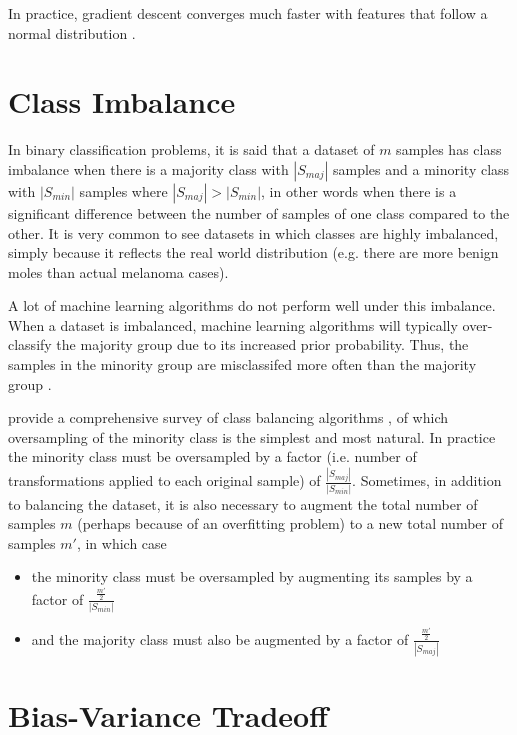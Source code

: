 In practice, gradient descent converges much faster with features that follow a normal distribution \cite{batchnormalization}.

\section{Class Imbalance}
\label{subsection:classimbalance}

In binary classification problems, it is said that a dataset of $m$ samples has class imbalance when there is a majority class with $|S_{maj}|$ samples and a minority class with $|S_{min}|$ samples where $|S_{maj}| > |S_{min}|$, in other words when there is a significant difference between the number of samples of one class compared to the other. It is very common to see datasets in which classes are highly imbalanced, simply because it reflects the real world distribution (e.g. there are more benign moles than actual melanoma cases).

A lot of machine learning algorithms do not perform well under this imbalance. When a dataset is imbalanced, machine learning algorithms will typically over-classify the majority group due to its increased prior probability. Thus, the samples in the minority group are misclassifed more often than the majority group \cite{Johnson2019}.

\citeauthor{haibo2009} provide a comprehensive survey of class balancing algorithms \cite{haibo2009}, of which oversampling of the minority class is the simplest and most natural. In practice the minority class must be oversampled by a factor (i.e. number of transformations applied to each original sample) of $\frac{|S_{maj}|}{|S_{min}|}$. Sometimes, in addition to balancing the dataset, it is also necessary to augment the total number of samples $m$ (perhaps because of an overfitting problem) to a new total number of samples $m'$, in which case

\begin{itemize}
    \item the minority class must be oversampled by augmenting its samples  by a factor of $\frac{\frac{m'}{2}}{|S_{min}|}$
    \item and the majority class must also be augmented by a factor of $\frac{\frac{m'}{2}}{|S_{maj}|}$
\end{itemize}

\section{Bias-Variance Tradeoff}

